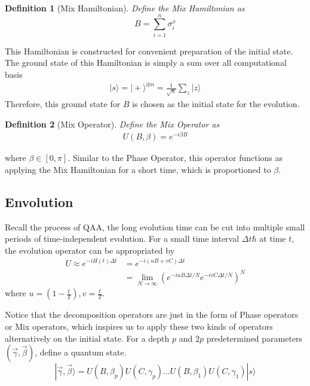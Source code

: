 \documentclass{./source/Report}
\newtheorem{definition}{Definition}
\begin{document}
\begin{definition}[Mix Hamiltonian]
Define the Mix Hamiltonian as 
\begin{equation}
    B=\sum_{i=1}^n\sigma_i^x
\end{equation}
\end{definition}
This Hamiltonian is constructed for convenient preparation of the initial state. 
The ground state of this Hamiltonian is simply a sum over all computational basis
\begin{align*}
    |s\rangle = |+\rangle^{\oplus n}=\frac{1}{\sqrt{n}}\sum_z |z\rangle
\end{align*} 
Therefore, this ground state for $B$ is chosen as the initial state for the evolution.

\begin{definition}[Mix Operator]
Define the Mix Operator as 
\begin{align*}
    U(B, \beta)=e^{-i\beta B}
\end{align*} 
\end{definition}
where $\beta \in [0, \pi]$. Similar to the Phase Operator, this operator functions 
as applying the Mix Hamiltonian for a short time, which is proportioned to $\beta$. 

\subsection{Envolution}

Recall the process of QAA, the long evolution time can 
be cut into multiple small periods of time-independent evolution.
For a small time interval $\Delta t \hbar$ at time $t$, the evolution operator 
can be appropriated by 
\begin{equation}
    \begin{aligned}
   U \approx e^{-iH(t)\Delta t} &= e^{-i(uB+vC)\Delta t} \\
   &= \lim_{N\rightarrow \infty}(e^{-iuB\Delta t/N}e^{-ivC\Delta t/N})^N
    \end{aligned}
\end{equation}
where $u=(1-\frac{t}{T}), v=\frac{t}{T}$. 

Notice that the decomposition operators are just 
in the form of Phase operators or Mix operators, which inspires us to apply these two kinds of 
operators alternatively on the initial state. For a depth $p$ and $2p$ predetermined parameters 
$(\vec{\gamma}, \vec{\beta})$, define a quantum state.
\begin{equation}
    |\vec{\gamma}, \vec{\beta}\rangle=U(B,\beta_p)U(C,\gamma_p)...U(B,\beta_1)U(C,\gamma_1)|s\rangle 
\end{equation}
\end{document}
